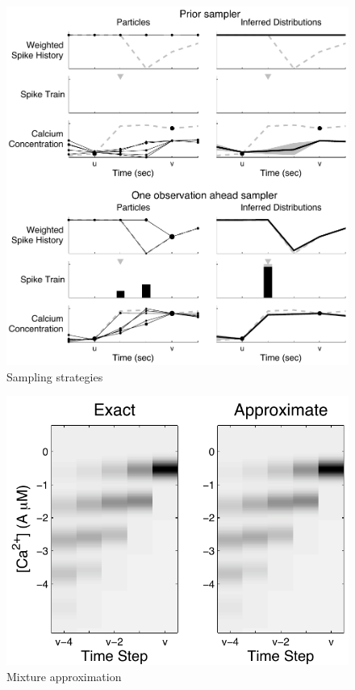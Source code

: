 \documentclass[10pt]{article}
\begin{document}
\clearpage \newpage
\begin{figure}
\centering \includegraphics[width=1\linewidth]{SimSampl_bw}
\caption{Sampling strategies} \label{fig:sampl}
\end{figure}

\clearpage \newpage
\begin{figure}
\centering
\includegraphics[width=0.5\linewidth]{PFapprox2}
\caption{Mixture approximation} \label{fig:pf2}
\end{figure}
\end{document}
